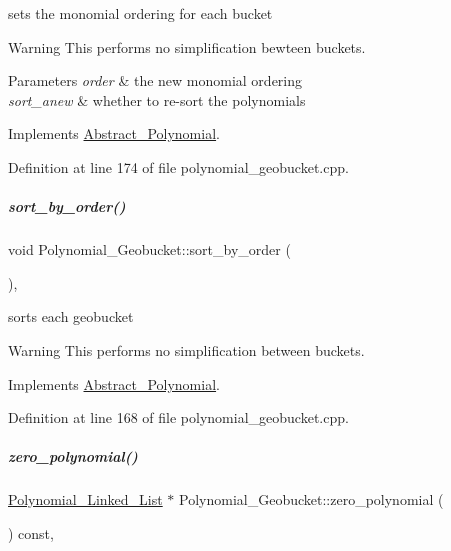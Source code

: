 sets the monomial ordering for each bucket 

\begin{DoxyWarning}{Warning}
This performs no simplification bewteen buckets. 
\end{DoxyWarning}

\begin{DoxyParams}{Parameters}
{\em order} & the new monomial ordering \\
\hline
{\em sort\+\_\+anew} & whether to re-\/sort the polynomials \\
\hline
\end{DoxyParams}


Implements \hyperlink{group__polygroup_a12e023570eb675343c4b7ed635a031dc}{Abstract\+\_\+\+Polynomial}.



Definition at line 174 of file polynomial\+\_\+geobucket.\+cpp.

\mbox{\label{group__polygroup_ad3c705cb5c03be2ed62fea65101d1195}} 
\subparagraph{\texorpdfstring{sort\+\_\+by\+\_\+order()}{sort\_by\_order()}}
{\footnotesize\ttfamily void Polynomial\+\_\+\+Geobucket\+::sort\+\_\+by\+\_\+order (\begin{DoxyParamCaption}{ }\end{DoxyParamCaption})\hspace{0.3cm}{\ttfamily [override]}, {\ttfamily [virtual]}}



sorts each geobucket 

\begin{DoxyWarning}{Warning}
This performs no simplification between buckets. 
\end{DoxyWarning}


Implements \hyperlink{group__polygroup_a1fcdd29c324c660ea935197c39e682f2}{Abstract\+\_\+\+Polynomial}.



Definition at line 168 of file polynomial\+\_\+geobucket.\+cpp.

\mbox{\label{group__polygroup_a7723d297ad268bb7139b1592f4e2eaff}} 
\subparagraph{\texorpdfstring{zero\+\_\+polynomial()}{zero\_polynomial()}}
{\footnotesize\ttfamily \hyperlink{group__polygroup_class_polynomial___linked___list}{Polynomial\+\_\+\+Linked\+\_\+\+List} $\ast$ Polynomial\+\_\+\+Geobucket\+::zero\+\_\+polynomial (\begin{DoxyParamCaption}{ }\end{DoxyParamCaption}) const\hspace{0.3cm}{\ttfamily [override]}, {\ttfamily [virtual]}}



